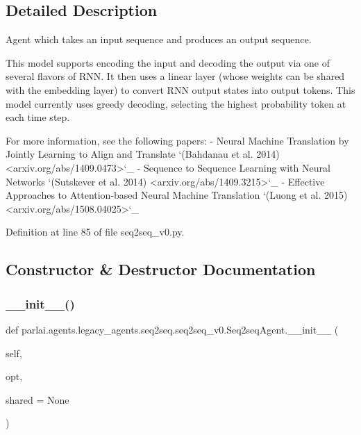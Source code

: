 \subsection{Detailed Description}
\begin{DoxyVerb}Agent which takes an input sequence and produces an output sequence.

This model supports encoding the input and decoding the output via one of
several flavors of RNN. It then uses a linear layer (whose weights can
be shared with the embedding layer) to convert RNN output states into
output tokens. This model currently uses greedy decoding, selecting the
highest probability token at each time step.

For more information, see the following papers:
- Neural Machine Translation by Jointly Learning to Align and Translate
  `(Bahdanau et al. 2014) <arxiv.org/abs/1409.0473>`_
- Sequence to Sequence Learning with Neural Networks
  `(Sutskever et al. 2014) <arxiv.org/abs/1409.3215>`_
- Effective Approaches to Attention-based Neural Machine Translation
  `(Luong et al. 2015) <arxiv.org/abs/1508.04025>`_
\end{DoxyVerb}
 

Definition at line 85 of file seq2seq\+\_\+v0.\+py.



\subsection{Constructor \& Destructor Documentation}
\mbox{\label{classparlai_1_1agents_1_1legacy__agents_1_1seq2seq_1_1seq2seq__v0_1_1Seq2seqAgent_a88801410eefdb0b71bb674a0768e87b9}} 
\subsubsection{\texorpdfstring{\+\_\+\+\_\+init\+\_\+\+\_\+()}{\_\_init\_\_()}}
{\footnotesize\ttfamily def parlai.\+agents.\+legacy\+\_\+agents.\+seq2seq.\+seq2seq\+\_\+v0.\+Seq2seq\+Agent.\+\_\+\+\_\+init\+\_\+\+\_\+ (\begin{DoxyParamCaption}\item[{}]{self,  }\item[{}]{opt,  }\item[{}]{shared = {\ttfamily None} }\end{DoxyParamCaption})}

